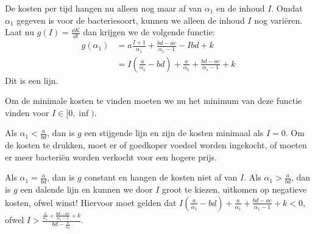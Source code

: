 De kosten per tijd hangen nu alleen nog maar af van $\alpha_1$ en de inhoud $I$. Omdat $\alpha_1$ gegeven is voor de bacteriesoort, kunnen we alleen de inhoud $I$ nog vari\"eren. Laat nu $g(I) = \frac{\dd K}{\dd t}$ dan krijgen we de volgende functie:
\begin{align*}
g(\alpha_1)
&=a\frac{I+1}{\alpha_1} + \frac{bd-ac}{\alpha_1-1} - Ibd + k\\
&=I\left(\frac{a}{\alpha_1}-bd\right) + \frac{a}{\alpha_1} + \frac{bd-ac}{\alpha_1-1} + k
\end{align*}
Dit is een lijn.

Om de minimale kosten te vinden moeten we nu het minimum van deze functie vinden voor $I\in[0,\inf)$.

Als $\alpha_1<\frac{a}{bd}$, dan is $g$ een stijgende lijn en zijn de kosten minimaal als $I = 0$. Om de kosten te drukken, moet er of goedkoper voedsel worden ingekocht, of moeten er meer bacteri\"en worden verkocht voor een hogere prijs.

Als $\alpha_1=\frac{a}{bd}$, dan is $g$ constant en hangen de kosten niet af van $I$. Als $\alpha_1>\frac{a}{bd}$, dan is $g$ een dalende lijn en kunnen we door $I$ groot te kiezen, uitkomen op negatieve kosten, ofwel winst! Hiervoor moet gelden dat $I\left(\frac{a}{\alpha_1}-bd\right) + \frac{a}{\alpha_1} + \frac{bd-ac}{\alpha_1-1} + k < 0$, ofwel $I > \frac{\frac{a}{\alpha_1} + \frac{bd-ac}{\alpha_1-1} + k}{bd-\frac{a}{\alpha_1}}$.








